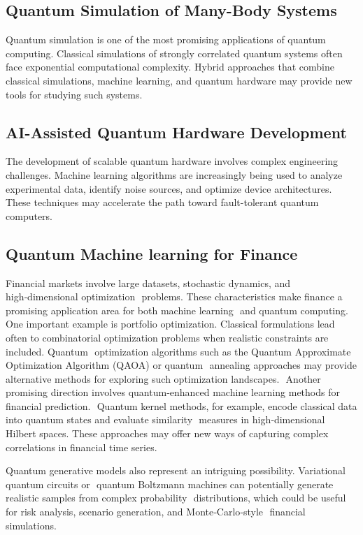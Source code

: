 \documentclass[11pt]{article}
\begin{document}
\subsection{Quantum Simulation of Many-Body Systems}

Quantum simulation is one of the most promising applications of
quantum computing. Classical simulations of strongly correlated
quantum systems often face exponential computational
complexity. Hybrid approaches that combine classical simulations,
machine learning, and quantum hardware may provide new tools for
studying such systems.

\subsection{AI-Assisted Quantum Hardware Development}

The development of scalable quantum hardware involves complex
engineering challenges. Machine learning algorithms are increasingly
being used to analyze experimental data, identify noise sources, and
optimize device architectures. These techniques may accelerate the
path toward fault-tolerant quantum computers.

\subsection{Quantum Machine learning for Finance}
Financial markets involve large datasets, stochastic dynamics, and
high‑dimensional optimization  problems. These characteristics make
finance a promising application area for both machine learning  and
quantum computing.  One important example is portfolio
optimization. Classical formulations lead often
to combinatorial optimization problems when realistic constraints are
included. Quantum  optimization algorithms such as the Quantum
Approximate Optimization Algorithm (QAOA) or quantum  annealing
approaches may provide alternative methods for exploring such
optimization landscapes.  Another promising direction involves
quantum‑enhanced machine learning methods for financial
prediction.  Quantum kernel methods, for example, encode classical
data into quantum states and evaluate similarity  measures in
high‑dimensional Hilbert spaces. These approaches may offer new ways
of capturing complex  correlations in financial time series. 


Quantum generative models also represent an intriguing
possibility. Variational quantum circuits or  quantum Boltzmann
machines can potentially generate realistic samples from complex
probability  distributions, which could be useful for risk analysis,
scenario generation, and Monte‑Carlo‑style  financial simulations.
\end{document}
